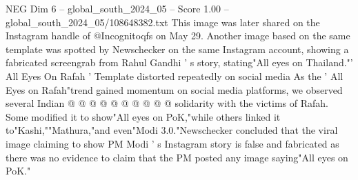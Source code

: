 \begin{textsample}{NEG Dim 6 – global\_south\_2024\_05 – Score 1.00 – global\_south\_2024\_05/108648382.txt}
This image was later shared on the Instagram handle of @Incognitoqfs on May 29.
Another image based on the same template was spotted by Newschecker on the same Instagram account, showing a fabricated screengrab from Rahul Gandhi ' s story, stating"All eyes on Thailand."' All Eyes On Rafah ' Template distorted repeatedly on social media As the ' All Eyes on Rafah"trend gained momentum on social media platforms, we observed several Indian @ @ @ @ @ @ @ @ @ @ solidarity with the victims of Rafah.
Some modified it to show"All eyes on PoK,"while others linked it to"Kashi,""Mathura,"and even"Modi 3.0."Newschecker concluded that the viral image claiming to show PM Modi ' s Instagram story is false and fabricated as there was no evidence to claim that the PM posted any image saying"All eyes on PoK."

\end{textsample}
